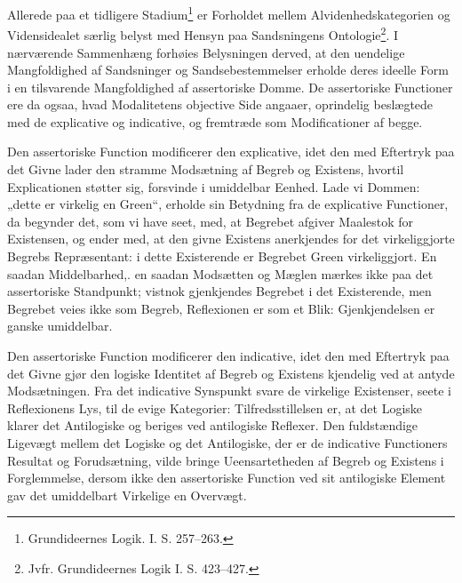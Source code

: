 \documentclass[12pt]{book}
\newcommand{\opage}[1]{\marginnote{\footnotesize\textit{[#1]}}}
\begin{document}
Allerede paa et tidligere Stadium\footnote{Grundideernes Logik. I. S. 257--263.} %
er Forholdet mellem
Alvidenhedskategorien og Vidensidealet særlig belyst med Hensyn
paa Sandsningens Ontologie\footnote{Jvfr. Grundideernes Logik I. S. 423--427.}. %
I nærværende Sammenhæng
forhøies Belysningen derved, at den uendelige Mangfoldighed
af Sandsninger og Sandsebestemmelser erholde deres
ideelle Form i en tilsvarende Mangfoldighed af assertoriske
Domme. De assertoriske Functioner ere da ogsaa, hvad Modalitetens
objective Side angaaer, oprindelig beslægtede med
de explicative og indicative, og fremtræde som Modificationer
af begge.

Den assertoriske Function modificerer den explicative, idet
den med Eftertryk paa det Givne lader den stramme
Mod\opage{191}sætning af Begreb og Existens, hvortil Explicationen støtter
sig, forsvinde i umiddelbar Eenhed. Lade vi Dommen: „dette
er virkelig en Green“, erholde sin Betydning fra de explicative
Functioner, da begynder det, som vi have seet, med, at Begrebet
afgiver Maalestok for Existensen, og ender med, at
den givne Existens anerkjendes for det virkeliggjorte Begrebs
Repræsentant: i dette Existerende er Begrebet Green virkeliggjort.
En saadan Middelbarhed,. en saadan Modsætten og
Mæglen mærkes ikke paa det assertoriske Standpunkt; vistnok
gjenkjendes Begrebet i det Existerende, men Begrebet veies
ikke som Begreb, Reflexionen er som et Blik: Gjenkjendelsen
er ganske umiddelbar.

Den assertoriske Function modificerer den indicative, idet
den med Eftertryk paa det Givne gjør den logiske Identitet
af Begreb og Existens kjendelig ved at antyde Modsætningen.
Fra det indicative Synspunkt svare de virkelige Existenser,
seete i Reflexionens Lys, til de evige Kategorier: Tilfredsstillelsen
er, at det Logiske klarer det Antilogiske og beriges
ved antilogiske Reflexer. Den fuldstændige Ligevægt mellem
det Logiske og det Antilogiske, der er de indicative Functioners
Resultat og Forudsætning, vilde bringe Ueensartetheden af
Begreb og Existens i Forglemmelse, dersom ikke den assertoriske
Function ved sit antilogiske Element gav det umiddelbart
Virkelige en Overvægt.
\end{document}
